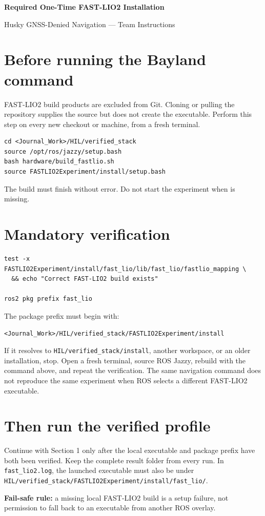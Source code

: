 \documentclass[11pt,a4paper]{article}
\begin{document}
\begin{center}
{\Large\bfseries Required One-Time FAST-LIO2 Installation}\par
\vspace{3pt}
{\small Husky GNSS-Denied Navigation --- Team Instructions}
\end{center}

\section*{Before running the Bayland command}
FAST-LIO2 build products are excluded from Git. Cloning or pulling the
repository supplies the source but does not create the executable. Perform this
step on every new checkout or machine, from a fresh terminal.

\begin{lstlisting}
cd <Journal_Work>/HIL/verified_stack
source /opt/ros/jazzy/setup.bash
bash hardware/build_fastlio.sh
source FASTLIO2Experiment/install/setup.bash
\end{lstlisting}

The build must finish without error. Do not start the experiment when
 is missing.

\section*{Mandatory verification}
\begin{lstlisting}
test -x FASTLIO2Experiment/install/fast_lio/lib/fast_lio/fastlio_mapping \
  && echo "Correct FAST-LIO2 build exists"

ros2 pkg prefix fast_lio
\end{lstlisting}

The package prefix must begin with:

\begin{lstlisting}
<Journal_Work>/HIL/verified_stack/FASTLIO2Experiment/install
\end{lstlisting}

If it resolves to \texttt{HIL/verified\_stack/install}, another workspace, or
an older installation, stop. Open a fresh terminal, source ROS Jazzy, rebuild
with the command above, and repeat the verification. The same navigation
command does not reproduce the same experiment when ROS selects a different
FAST-LIO2 executable.

\section*{Then run the verified profile}
Continue with Section 1 only after the local executable and package prefix have
both been verified. Keep the complete result folder from every run. In
\texttt{fast\_lio2.log}, the launched executable must also be under
\texttt{HIL/verified\_stack/FASTLIO2Experiment/install/fast\_lio/}.

\vfill
\noindent\textbf{Fail-safe rule:} a missing local FAST-LIO2 build is a setup
failure, not permission to fall back to an executable from another ROS overlay.
\end{document}
